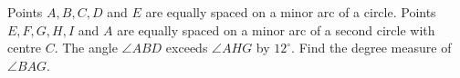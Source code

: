 Points $A,B,C,D$ and $E$ are equally spaced on a minor arc of a circle. Points $E,F,G,H,I$ and $A$ are equally spaced on a minor arc of a second circle with centre $C$. The angle $\angle ABD$ exceeds $\angle AHG$ by $12^\circ$. Find the degree measure of $\angle BAG$.
